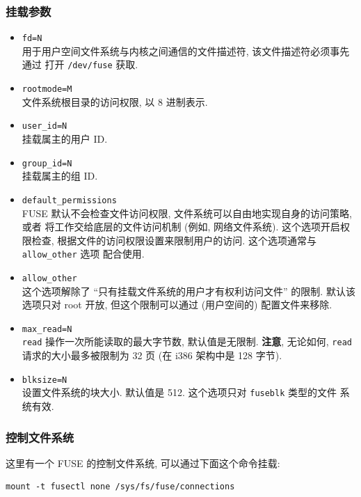 \documentclass[nofonts]{ctexart}
\begin{document}
\subsubsection{挂载参数}\label{ux6302ux8f7dux53c2ux6570}

\begin{itemize}
\item
  \texttt{fd=N}\\用于用户空间文件系统与内核之间通信的文件描述符,
  该文件描述符必须事先通过 打开 \texttt{/dev/fuse} 获取.
\item
  \texttt{rootmode=M}\\文件系统根目录的访问权限, 以 8 进制表示.
\item
  \texttt{user\_id=N}\\挂载属主的用户 ID.
\item
  \texttt{group\_id=N}\\挂载属主的组 ID.
\item
  \texttt{default\_permissions}\\FUSE 默认不会检查文件访问权限,
  文件系统可以自由地实现自身的访问策略, 或者
  将工作交给底层的文件访问机制 (例如, 网络文件系统).
  这个选项开启权限检查, 根据文件的访问权限设置来限制用户的访问.
  这个选项通常与 \texttt{allow\_other} 选项 配合使用.
\item
  \texttt{allow\_other}\\这个选项解除了
  ``只有挂载文件系统的用户才有权利访问文件'' 的限制. 默认该 选项只对
  root 开放, 但这个限制可以通过 (用户空间的) 配置文件来移除.
\item
  \texttt{max\_read=N}\\\texttt{read} 操作一次所能读取的最大字节数,
  默认值是无限制. \textbf{注意}, 无论如何, \texttt{read}
  请求的大小最多被限制为 32 页 (在 i386 架构中是 128 字节).
\item
  \texttt{blksize=N}\\设置文件系统的块大小. 默认值是 512. 这个选项只对
  \texttt{fuseblk} 类型的文件 系统有效.
\end{itemize}

\subsubsection{控制文件系统}\label{ux63a7ux5236ux6587ux4ef6ux7cfbux7edf}

这里有一个 FUSE 的控制文件系统, 可以通过下面这个命令挂载:

\begin{verbatim}
mount -t fusectl none /sys/fs/fuse/connections
\end{verbatim}
\end{document}
